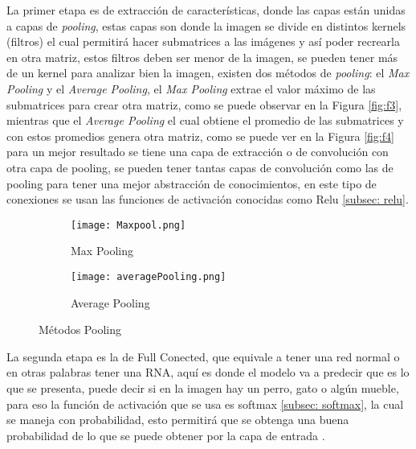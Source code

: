             La primer etapa es de extracci\'on de características, donde las capas están unidas a capas de \textit{pooling}, estas capas son 
            donde la imagen se divide en distintos kernels (filtros) el cual permitirá hacer submatrices a las imágenes y así poder recrearla
            en otra matriz, estos filtros deben ser menor de la imagen, se pueden tener m\'as de un kernel para
            analizar bien la imagen, existen dos m\'etodos de \textit{pooling}: el \textit{Max Pooling} y el \textit{Average Pooling},
             el \textit{Max Pooling} extrae el valor m\'aximo de las submatrices para crear otra matriz, como se puede observar en la 
            Figura \eqref{fig:f3}, mientras que el \textit{Average Pooling} el cual obtiene el promedio de las submatrices y con 
            estos promedios genera otra matriz, como se puede ver en la Figura \eqref{fig:f4} para un mejor resultado se tiene una capa de extracci\'on 
            o de convoluci\'on con otra capa de pooling, se pueden tener tantas capas de convoluci\'on como las de pooling 
            para tener una mejor abstracci\'on de conocimientos, en este tipo de conexiones se usan las funciones de activaci\'on conocidas como Relu \eqref{subsec: relu}. 

            \begin{figure}[H]
                \begin{subfigure}[H]{0.49\textwidth}
                    \texttt{[image: Maxpool.png]}
                    \caption{Max Pooling}
                    \label{fig:f3}
                \end{subfigure}
                \hfill
                \begin{subfigure}[H]{0.49\textwidth}
                    \texttt{[image: averagePooling.png]}
                    \caption{Average Pooling}
                    \label{fig:f4}
                \end{subfigure}
                \caption{M\'etodos Pooling}
            \end{figure}

            La segunda etapa es la de Full Conected, que equivale a tener una red normal o en otras palabras tener una RNA, aqu\'i 
            es donde el modelo va a predecir que es lo que se presenta, puede decir si en la imagen hay un perro, gato o alg\'un mueble, 
            para eso la funci\'on de activaci\'on que se usa es softmax \eqref{subsec: softmax}, la cual se maneja con probabilidad, esto
            permitirá que se obtenga una buena probabilidad de lo que se puede obtener por la capa de entrada \cite{duran2017,Ortiz2020}.\\
  

